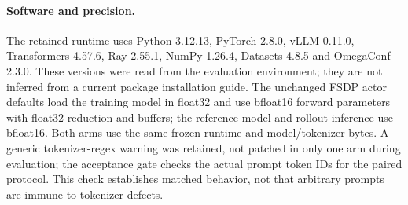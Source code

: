 \paragraph{Software and precision.}
The retained runtime uses Python 3.12.13, PyTorch 2.8.0, vLLM 0.11.0, Transformers 4.57.6, Ray 2.55.1, NumPy 1.26.4, Datasets 4.8.5 and OmegaConf 2.3.0. These versions were read from the evaluation environment; they are not inferred from a current package installation guide. The unchanged FSDP actor defaults load the training model in float32 and use bfloat16 forward parameters with float32 reduction and buffers; the reference model and rollout inference use bfloat16. Both arms use the same frozen runtime and model/tokenizer bytes. A generic tokenizer-regex warning was retained, not patched in only one arm during evaluation; the acceptance gate checks the actual prompt token IDs for the paired protocol. This check establishes matched behavior, not that arbitrary prompts are immune to tokenizer defects.
